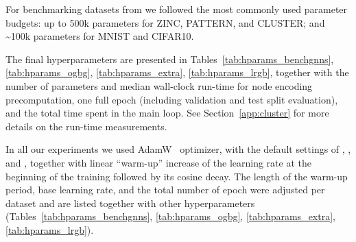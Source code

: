 \documentclass{article}
\begin{document}
For benchmarking datasets from \citet{dwivedi2020benchmarking} we followed the most commonly used parameter budgets: up to 500k parameters for ZINC, PATTERN, and CLUSTER; and \textasciitilde100k parameters for MNIST and CIFAR10.

The final hyperparameters are presented in Tables~\ref{tab:hparams_benchgnns}, \ref{tab:hparams_ogbg}, \ref{tab:hparams_extra}, \ref{tab:hparams_lrgb}, together with the number of parameters and median wall-clock run-time for node encoding precomputation, one full epoch (including validation and test split evaluation), and the total time spent in the main loop. See Section~\ref{app:cluster} for more details on the run-time measurements.

In all our experiments we used AdamW~\cite{loshchilov2018decoupled} optimizer, with the default settings of , , and , together with linear ``warm-up'' increase of the learning rate at the beginning of the training followed by its cosine decay. The length of the warm-up period, base learning rate, and the total number of epoch were adjusted per dataset and are listed together with other hyperparameters (Tables~\ref{tab:hparams_benchgnns}, \ref{tab:hparams_ogbg}, \ref{tab:hparams_extra}, \ref{tab:hparams_lrgb}).
\end{document}
